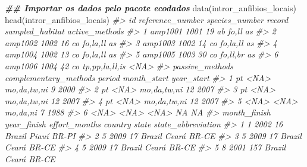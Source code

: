 \documentclass[
]{book}
\newenvironment{Shaded}{\begin{snugshade}}{\end{snugshade}}
\newcommand{\CommentTok}[1]{\textcolor[rgb]{0.37,0.37,0.37}{\textit{#1}}}
\newcommand{\DocumentationTok}[1]{\textcolor[rgb]{0.37,0.37,0.37}{\textbf{\textit{#1}}}}
\newcommand{\FunctionTok}[1]{\textcolor[rgb]{0,0,0}{#1}}
\newcommand{\NormalTok}[1]{#1}
\begin{document}
\begin{Shaded}
\begin{Highlighting}[]
\DocumentationTok{\#\# Importar os dados pelo pacote ecodados}
\FunctionTok{data}\NormalTok{(intror\_anfibios\_locais)}
\FunctionTok{head}\NormalTok{(intror\_anfibios\_locais)}
\CommentTok{\#\textgreater{}        id reference\_number species\_number record sampled\_habitat active\_methods}
\CommentTok{\#\textgreater{} 1 amp1001             1001             19     ab           fo,ll             as}
\CommentTok{\#\textgreater{} 2 amp1002             1002             16     co        fo,la,ll             as}
\CommentTok{\#\textgreater{} 3 amp1003             1002             14     co        fo,la,ll             as}
\CommentTok{\#\textgreater{} 4 amp1004             1002             13     co        fo,la,ll             as}
\CommentTok{\#\textgreater{} 5 amp1005             1003             30     co        fo,ll,br             as}
\CommentTok{\#\textgreater{} 6 amp1006             1004             42     co  tp,pp,la,ll,is           \textless{}NA\textgreater{}}
\CommentTok{\#\textgreater{}   passive\_methods complementary\_methods      period month\_start year\_start}
\CommentTok{\#\textgreater{} 1              pt                  \textless{}NA\textgreater{} mo,da,tw,ni           9       2000}
\CommentTok{\#\textgreater{} 2              pt                  \textless{}NA\textgreater{} mo,da,tw,ni          12       2007}
\CommentTok{\#\textgreater{} 3              pt                  \textless{}NA\textgreater{} mo,da,tw,ni          12       2007}
\CommentTok{\#\textgreater{} 4              pt                  \textless{}NA\textgreater{} mo,da,tw,ni          12       2007}
\CommentTok{\#\textgreater{} 5            \textless{}NA\textgreater{}                  \textless{}NA\textgreater{}    mo,da,ni           7       1988}
\CommentTok{\#\textgreater{} 6            \textless{}NA\textgreater{}                  \textless{}NA\textgreater{}        \textless{}NA\textgreater{}          NA         NA}
\CommentTok{\#\textgreater{}   month\_finish year\_finish effort\_months country state state\_abbreviation}
\CommentTok{\#\textgreater{} 1            1        2002            16  Brazil Piauí              BR{-}PI}
\CommentTok{\#\textgreater{} 2            5        2009            17  Brazil Ceará              BR{-}CE}
\CommentTok{\#\textgreater{} 3            5        2009            17  Brazil Ceará              BR{-}CE}
\CommentTok{\#\textgreater{} 4            5        2009            17  Brazil Ceará              BR{-}CE}
\CommentTok{\#\textgreater{} 5            8        2001           157  Brazil Ceará              BR{-}CE}

\end{Highlighting}
\end{Shaded}
\end{document}
